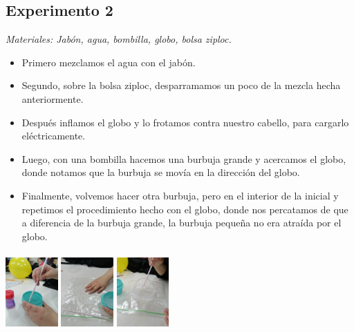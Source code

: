 \documentclass[a4paper, 12p]{article}
\newenvironment{Figura}
  {\par\medskip\noindent\minipage{\linewidth}}
  {\endminipage\par\medskip}
\begin{document}
\begin{multicols*}{2}




\section*{Experimento 2}
\textit{Materiales: Jabón, agua, bombilla, globo, bolsa ziploc.}

\vspace{-\topsep}
\begin{itemize}
    \setlength{\parskip}{0pt} 
    \setlength{\itemsep}{0pt plus 1pt}
    \item Primero mezclamos el agua con el jabón.
    \item Segundo, sobre la bolsa ziploc, desparramamos un poco de la mezcla hecha anteriormente.
    \item Después inflamos el globo y lo frotamos contra nuestro cabello, para cargarlo eléctricamente.
    \item Luego, con una bombilla hacemos una burbuja grande y acercamos el globo, donde notamos que la burbuja se movía en la dirección del globo.
    \item Finalmente, volvemos hacer otra burbuja, pero en el interior de la inicial y repetimos el procedimiento hecho con el globo, donde nos percatamos de que a diferencia
    de la burbuja grande, la burbuja pequeña no era atraída por el globo.
\end{itemize}
\vspace{-\topsep}



\begin{Figura}
    \centering
    \includegraphics[width=2cm, height=3cm]{imag/Exp2_00.jpg}
    \includegraphics[width=2cm, height=3cm]{imag/Exp2_01.jpg}
    \includegraphics[width=2cm, height=3cm]{imag/Exp2_02.jpg}
\end{Figura}  


\end{multicols*}
\end{document}
